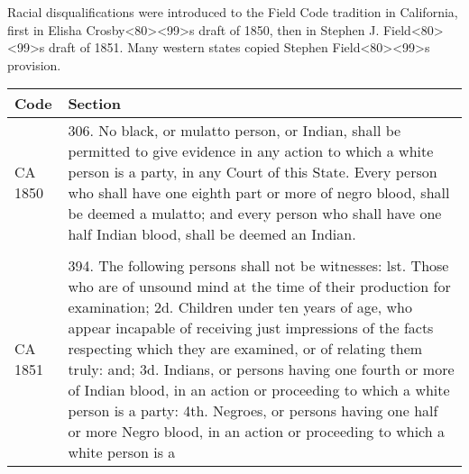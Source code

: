 \documentclass[12pt,]{article}
\begin{document}
Racial disqualifications were introduced to the Field Code tradition in
California, first in Elisha
Crosby\textless80\textgreater\textless99\textgreater s draft of 1850,
then in Stephen J. Field\textless80\textgreater\textless99\textgreater s
draft of 1851. Many western states copied Stephen
Field\textless80\textgreater\textless99\textgreater s provision.

\begin{longtable}[]{@{}ll@{}}
\toprule
\begin{minipage}[b]{0.17\columnwidth}\raggedright
Code\strut
\end{minipage} & \begin{minipage}[b]{0.77\columnwidth}\raggedright
Section\strut
\end{minipage}\tabularnewline
\midrule
\endhead
\begin{minipage}[t]{0.17\columnwidth}\raggedright
CA 1850\strut
\end{minipage} & \begin{minipage}[t]{0.77\columnwidth}\raggedright
306. No black, or mulatto person, or Indian, shall be permitted to give
evidence in any action to which a white person is a party, in any Court
of this State. Every person who shall have one eighth part or more of
negro blood, shall be deemed a mulatto; and every person who shall have
one half Indian blood, shall be deemed an Indian.\strut
\end{minipage}\tabularnewline
\begin{minipage}[t]{0.17\columnwidth}\raggedright
\strut
\end{minipage} & \begin{minipage}[t]{0.77\columnwidth}\raggedright
\strut
\end{minipage}\tabularnewline
\begin{minipage}[t]{0.17\columnwidth}\raggedright
CA 1851\strut
\end{minipage} & \begin{minipage}[t]{0.77\columnwidth}\raggedright
394. The following persons shall not be witnesses: lst. Those who are of
unsound mind at the time of their production for examination; 2d.
Children under ten years of age, who appear incapable of receiving just
impressions of the facts respecting which they are examined, or of
relating them truly: and; 3d. Indians, or persons having one fourth or
more of Indian blood, in an action or proceeding to which a white person
is a party: 4th. Negroes, or persons having one half or more Negro
blood, in an action or proceeding to which a white person is a

\end{minipage}
\end{longtable}
\end{document}
